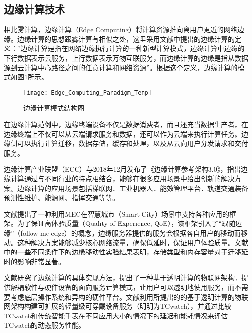 \subsection{边缘计算技术}

相比雾计算，边缘计算（Edge Computing）将计算资源推向离用户更近的网络边缘。边缘计算的思想跟雾计算有相似之处，这里采用文献\cite{施巍松2017边缘计算}中提出的边缘计算的定义：“边缘计算是指在网络边缘执行计算的一种新型计算模式，边缘计算中边缘的下行数据表示云服务，上行数据表示万物互联服务，而边缘计算的边缘是指从数据源到云计算中心路径之间的任意计算和网络资源”。根据这个定义，边缘计算的模式如图\ref{fig:edge_computing_paradigm}所示\cite{shi2016edge}。


\begin{figure}[!htbp]
    \centering
    \texttt{[image: Edge\_Computing\_Paradigm\_Temp]}
    \caption{边缘计算模式结构图}
    \label{fig:edge_computing_paradigm}
\end{figure}

在边缘计算范例中，边缘终端设备不仅是数据消费者，而且还充当数据生产者。在边缘终端上不仅可以从云端请求服务和数据，还可以作为云端来执行计算任务。边缘侧可以执行计算迁移，数据存储，缓存和处理，以及从云向用户分发请求和交付服务\cite{shi2016edge}。

边缘计算产业联盟（ECC）与2018年12月发布了《边缘计算参考架构3.0》\cite{边缘计算架构2018}，指出边缘计算通过与不同行业的特点相结合，能够在很多应用场景中给出创新的解决方案。边缘计算的应用场景包括梯联网、工业机器人、能效管理平台、轨道交通装备预测性维护、能源网、指挥交通等等。

文献\cite{taleb2017mobile}提出了一种利用MEC在智慧城市（Smart City）场景中支持各种应用的框架。为了保证高体验质量（Quality of Experience, QoE），该框架引入了“跟随边缘”（follow me edge）的概念，边缘服务器提供的服务会根据各自用户的移动而移动。这种解决方案能够减少核心网络流量，确保低延时，保证用户体验质量。文献中的一些不同条件下的边缘移动性实验结果表明，存储类型和内存容量对于迁移延时的影响非常显著。

文献\cite{ren2017serving}研究了边缘计算的具体实现方法，提出了一种基于透明计算的物联网架构，提供解耦软件与硬件设备的面向服务计算模式，让用户可以透明地使用服务，而不需要考虑底层操作系统和异构的硬件平台。文献利用所提出的的基于透明计算的物联网架构构建可扩展的轻量级可穿戴设备服务（明明为TCwatch），并通过比较TCwatch和传统智能手表在不同应用大小的情况下的延迟和能耗情况来评估TCwatch的动态服务性能。

